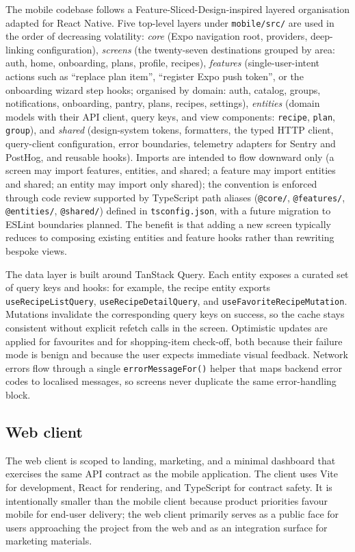 The mobile codebase follows a Feature-Sliced-Design-inspired layered organisation adapted for React Native. Five top-level layers under \texttt{mobile/src/} are used in the order of decreasing volatility: \emph{core} (Expo navigation root, providers, deep-linking configuration), \emph{screens} (the twenty-seven destinations grouped by area: auth, home, onboarding, plans, profile, recipes), \emph{features} (single-user-intent actions such as ``replace plan item'', ``register Expo push token'', or the onboarding wizard step hooks; organised by domain: auth, catalog, groups, notifications, onboarding, pantry, plans, recipes, settings), \emph{entities} (domain models with their API client, query keys, and view components: \texttt{recipe}, \texttt{plan}, \texttt{group}), and \emph{shared} (design-system tokens, formatters, the typed HTTP client, query-client configuration, error boundaries, telemetry adapters for Sentry and PostHog, and reusable hooks). Imports are intended to flow downward only (a screen may import features, entities, and shared; a feature may import entities and shared; an entity may import only shared); the convention is enforced through code review supported by TypeScript path aliases (\texttt{@core/}, \texttt{@features/}, \texttt{@entities/}, \texttt{@shared/}) defined in \texttt{tsconfig.json}, with a future migration to ESLint boundaries planned. The benefit is that adding a new screen typically reduces to composing existing entities and feature hooks rather than rewriting bespoke views.

The data layer is built around TanStack Query. Each entity exposes a curated set of query keys and hooks: for example, the recipe entity exports \texttt{useRecipeListQuery}, \texttt{useRecipeDetailQuery}, and \texttt{useFavoriteRecipeMutation}. Mutations invalidate the corresponding query keys on success, so the cache stays consistent without explicit refetch calls in the screen. Optimistic updates are applied for favourites and for shopping-item check-off, both because their failure mode is benign and because the user expects immediate visual feedback. Network errors flow through a single \texttt{errorMessageFor()} helper that maps backend error codes to localised messages, so screens never duplicate the same error-handling block.

\subsection{Web client}

The web client is scoped to landing, marketing, and a minimal dashboard that exercises the same API contract as the mobile application. The client uses Vite for development, React for rendering, and TypeScript for contract safety. It is intentionally smaller than the mobile client because product priorities favour mobile for end-user delivery; the web client primarily serves as a public face for users approaching the project from the web and as an integration surface for marketing materials.

